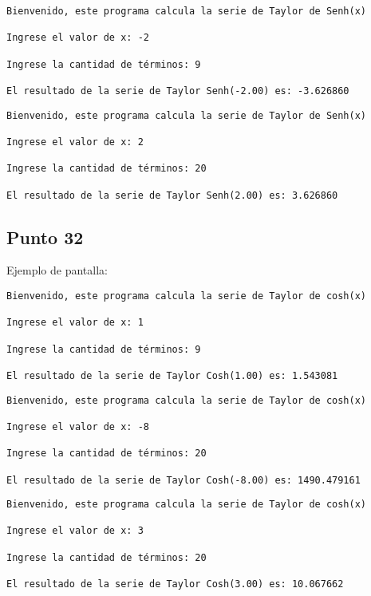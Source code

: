 \begin{lstlisting}
Bienvenido, este programa calcula la serie de Taylor de Senh(x)

Ingrese el valor de x: -2

Ingrese la cantidad de términos: 9

El resultado de la serie de Taylor Senh(-2.00) es: -3.626860
\end{lstlisting}

\begin{lstlisting}
Bienvenido, este programa calcula la serie de Taylor de Senh(x)

Ingrese el valor de x: 2

Ingrese la cantidad de términos: 20

El resultado de la serie de Taylor Senh(2.00) es: 3.626860
\end{lstlisting}





\subsection{Punto 32}
	
	Ejemplo de pantalla:
\begin{lstlisting}
Bienvenido, este programa calcula la serie de Taylor de cosh(x)

Ingrese el valor de x: 1

Ingrese la cantidad de términos: 9

El resultado de la serie de Taylor Cosh(1.00) es: 1.543081
\end{lstlisting}

\begin{lstlisting}
Bienvenido, este programa calcula la serie de Taylor de cosh(x)

Ingrese el valor de x: -8

Ingrese la cantidad de términos: 20

El resultado de la serie de Taylor Cosh(-8.00) es: 1490.479161
\end{lstlisting}

\begin{lstlisting}
Bienvenido, este programa calcula la serie de Taylor de cosh(x)

Ingrese el valor de x: 3

Ingrese la cantidad de términos: 20

El resultado de la serie de Taylor Cosh(3.00) es: 10.067662
\end{lstlisting}

